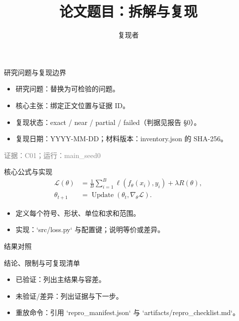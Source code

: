 \documentclass[aspectratio=169,11pt]{beamer}
\title{论文题目：拆解与复现}
\author{复现者}
\institute{期刊 / 会议，年份}
\date{\repodate}
\newcommand{\repodate}{YYYY-MM-DD}
\newcommand{\status}[1]{\hfill\scriptsize\textcolor{gray}{#1}}
\begin{document}
\begin{frame}\titlepage\end{frame}
\begin{frame}{研究问题与复现边界}
  \begin{itemize}
    \item 研究问题：替换为可检验的问题。
    \item 核心主张：绑定正文位置与证据 ID。
    \item 复现状态：exact / near / partial / failed（判据见报告 §0）。
    \item 复现日期：\repodate{}；材料版本：inventory.json 的 SHA-256。
  \end{itemize}
  \status{证据：C01；运行：main_seed0}
\end{frame}
\begin{frame}{核心公式与实现}
  \begin{align}
    \mathcal{L}(\theta) &= \frac{1}{B}\sum_{i=1}^{B} \ell(f_\theta(x_i),y_i) + \lambda R(\theta),\\
    \theta_{t+1} &= \operatorname{Update}(\theta_t,\nabla_\theta \mathcal{L}).
  \end{align}
  \begin{itemize}
    \item 定义每个符号、形状、单位和求和范围。
    \item 实现：`src/loss.py` 与配置键；说明等价或差异。
  \end{itemize}
\end{frame}
\begin{frame}{结果对照}
  \centering
\end{frame}
\begin{frame}{结论、限制与可复现清单}
  \begin{itemize}
    \item 已验证：列出主结果与容差。
    \item 未验证/差异：列出证据与下一步。
    \item 重放命令：引用 `repro_manifest.json` 与 `artifacts/repro_checklist.md`。
  \end{itemize}
\end{frame}
%   
%   
\end{document}

